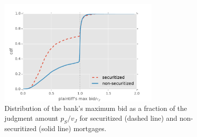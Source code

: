 \documentclass[11pt,twopage]{article}
\begin{document}
\begin{figure}
	\begin{center}
		\includegraphics[width=0.7\textwidth]{graphics/distr-maxbid-sec-nonsec}
		\caption{Distribution of the bank's maximum bid as a fraction of the judgment amount $p_S/v_J$ for securitized (dashed line) and non-securitized (solid line) mortgages.\label{fig:distr-maxbid-sec-nonsec}}
	\end{center}
\end{figure}
\end{document}
